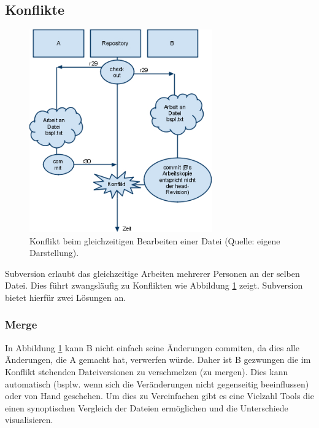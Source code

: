\subsection{Konflikte}
\begin{figure}[!htb]
\centering
\includegraphics[width=0.7\textwidth]{konflikt}
\caption{Konflikt beim gleichzeitigen Bearbeiten einer Datei (Quelle: eigene Darstellung).}
\label{fig:konflikt}
\end{figure}
Subversion erlaubt das gleichzeitige Arbeiten mehrerer Personen an der selben Datei. Dies führt zwangsläufig zu Konflikten wie Abbildung \ref{fig:konflikt} zeigt. Subversion bietet hierfür zwei Lösungen an.
\subsubsection{Merge}
In Abbildung \ref{fig:konflikt} kann B nicht einfach seine Änderungen commiten, da dies alle Änderungen, die A gemacht hat, verwerfen würde. Daher ist B gezwungen die im Konflikt stehenden Dateiversionen zu verschmelzen (zu mergen). Dies kann automatisch (bsplw. wenn sich die Veränderungen nicht gegenseitig beeinflussen) oder von Hand geschehen. Um dies zu Vereinfachen gibt es eine Vielzahl Tools die einen synoptischen Vergleich der Dateien ermöglichen und die Unterschiede visualisieren.

